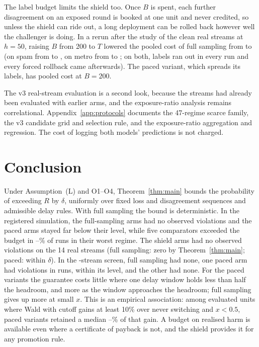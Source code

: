 \documentclass[10pt]{article}
\theoremstyle{plain}
\theoremstyle{definition}
\begin{document}
The label budget limits the shield too. Once $B$ is spent, each further disagreement on an exposed round is booked at one unit and never credited, so unless the shield can ride out, a long deployment can be rolled back however well the challenger is doing. In a rerun after the study of the clean real streams at $h=50$, raising $B$ from 200 to $T$ lowered the pooled cost of full sampling from \LabFull{} to \LabFullAll{} (on spam from \LabSpam{} to \LabSpamAll, on metro from \LabMetro{} to \LabMetroAll; on both, labels ran out in every run and every forced rollback came afterwards). The paced variant, which spreads its labels, has pooled cost \LabPaced{} at $B=200$.

The v3 real-stream evaluation is a second look, because the streams had already been evaluated with earlier arms, and the exposure-ratio analysis remains correlational. Appendix~\ref{app:protocols} documents the 47-regime scarce family, the v3 candidate grid and selection rule, and the exposure-ratio aggregation and regression. The cost of logging both models' predictions is not charged.

\section{Conclusion}
Under Assumption~(L) and O1--O4, Theorem~\ref{thm:main} bounds the probability of exceeding $R$ by $\delta$, uniformly over fixed loss and disagreement sequences and admissible delay rules. With full sampling the bound is deterministic. In the registered simulation, the full-sampling arms had no observed violations and the paced arms stayed far below their level, while five comparators exceeded the budget in \CThreeMinWorst--\CThreeMaxWorst\% of runs in their worst regime. The shield arms had no observed violations on the 14 real streams (full sampling: zero by Theorem~\ref{thm:main}; paced: within $\delta$). In the \ScreenPool-stream screen, full sampling had none, one paced arm had \ScreenPacedViol{} violations in \ScreenRunsPerArm{} runs, within its level, and the other had none. For the paced variants the guarantee costs little where one delay window holds less than half the headroom, and more as the window approaches the headroom; full sampling gives up more at small $x$. This is an empirical association: among evaluated units where Wald with cutoff gains at least 10\% over never switching and $x<0.5$, paced variants retained a median \KeepLo--\KeepHi\% of that gain. A budget on realised harm is available even where a certificate of payback is not, and the shield provides it for any promotion rule.
\end{document}
